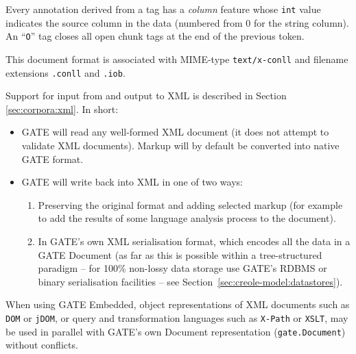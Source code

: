 Every annotation derived from a tag has a \emph{column} feature whose
\texttt{int} value indicates the source column in the data (numbered from 0 for
the string column).  An ``\texttt{O}'' tag closes all open chunk tags at the end
of the previous token.

This document format is associated with MIME-type \texttt{text/x-conll} and
filename extensions \texttt{.conll} and \texttt{.iob}.

Support for input from and output to XML is described in Section
\ref{sec:corpora:xml}. In short: 
%
\begin{itemize}
%
\item
GATE will read any well-formed XML document (it does not attempt to validate
XML documents). Markup will by default be converted into native GATE format.
%
\item
GATE will write back into XML in one of two ways:
  \begin{enumerate}
  \item
  Preserving the original format and adding selected markup (for example to
  add the results of some language analysis process to the document).
  \item
  In GATE's own XML serialisation format, which encodes all the data in a
  GATE Document (as far as this is possible within a tree-structured
  paradigm -- for 100\% non-lossy data storage use GATE's RDBMS or binary
  serialisation facilities -- see Section~\ref{sec:creole-model:datastores}).
  \end{enumerate}
%
\end{itemize}
%
When using GATE Embedded, object representations of XML documents such
as {\tt DOM} or {\tt jDOM}, or query and transformation languages such
as {\tt X-Path} or {\tt XSLT}, may be used in parallel with GATE's own
Document representation ({\tt gate.Document}) without conflicts.

